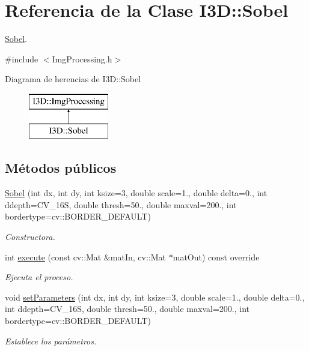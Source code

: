\hypertarget{class_i3_d_1_1_sobel}{}\section{Referencia de la Clase I3D\+:\+:Sobel}
\label{class_i3_d_1_1_sobel}


\hyperlink{class_i3_d_1_1_sobel}{Sobel}.  




{\ttfamily \#include $<$Img\+Processing.\+h$>$}

Diagrama de herencias de I3D\+:\+:Sobel\begin{figure}[H]
\begin{center}
\leavevmode
\includegraphics[height=2.000000cm]{class_i3_d_1_1_sobel}
\end{center}
\end{figure}
\subsection*{Métodos públicos}
\begin{DoxyCompactItemize}
\item 
\hyperlink{class_i3_d_1_1_sobel_a44bcc6981eb6875500cdee832174af71}{Sobel} (int dx, int dy, int ksize=3, double scale=1., double delta=0., int ddepth=C\+V\+\_\+16S, double thresh=50., double maxval=200., int bordertype=cv\+::\+B\+O\+R\+D\+E\+R\+\_\+\+D\+E\+F\+A\+U\+LT)
\begin{DoxyCompactList}\small\item\em Constructora. \end{DoxyCompactList}\item 
int \hyperlink{class_i3_d_1_1_sobel_a902c7392196e514597820fbe13a2a634}{execute} (const cv\+::\+Mat \&mat\+In, cv\+::\+Mat $\ast$mat\+Out) const  override
\begin{DoxyCompactList}\small\item\em Ejecuta el proceso. \end{DoxyCompactList}\item 
void \hyperlink{class_i3_d_1_1_sobel_a747c30a1d9b50aca3c7a6d737dc6c5c6}{set\+Parameters} (int dx, int dy, int ksize=3, double scale=1., double delta=0., int ddepth=C\+V\+\_\+16S, double thresh=50., double maxval=200., int bordertype=cv\+::\+B\+O\+R\+D\+E\+R\+\_\+\+D\+E\+F\+A\+U\+LT)
\begin{DoxyCompactList}\small\item\em Establece los parámetros. \end{DoxyCompactList}\end{DoxyCompactItemize}
